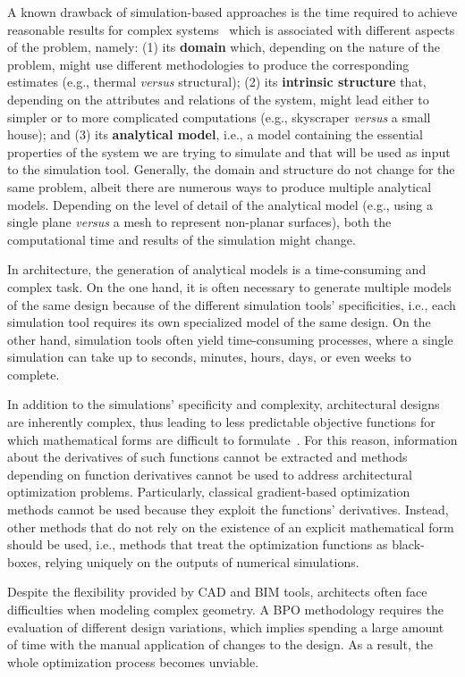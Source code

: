 	A known drawback of simulation-based approaches is the time required to achieve reasonable results for complex systems~\cite{Law1991} which is associated with different aspects of the problem, namely: (1) its \textbf{domain} which, depending on the nature of the problem, might use different methodologies to produce the corresponding estimates (e.g., thermal \textit{versus} structural); (2) its \textbf{intrinsic structure} that, depending on the attributes and relations of the system, might lead either to simpler or to more complicated computations (e.g., skyscraper \textit{versus} a small house); and (3) its \textbf{analytical model}, i.e., a model containing the essential properties of the system we are trying to simulate and that will be used as input to the simulation tool. Generally, the domain and structure do not change for the same problem, albeit there are numerous ways to produce multiple analytical models. Depending on the level of detail of the analytical model (e.g., using a single plane \textit{versus} a mesh to represent non-planar surfaces), both the computational time and results of the simulation might change. 

	In architecture, the generation of analytical models is a time-consuming and complex task. On the one hand, it is often necessary to generate multiple models of the same design because of the different simulation tools' specificities, i.e., each simulation tool requires its own specialized model of the same design. On the other hand, simulation tools often yield time-consuming processes, where a single simulation can take up to seconds, minutes, hours, days, or even weeks to complete. 
	
	In addition to the simulations' specificity and complexity, architectural designs are inherently complex, thus leading to less predictable objective functions for which mathematical forms are difficult to formulate~\cite{Machairas2014}. For this reason, information about the derivatives of such functions cannot be extracted and methods depending on function derivatives cannot be used to address architectural optimization problems. Particularly, classical gradient-based optimization methods cannot be used because they exploit the functions' derivatives. Instead, other methods that do not rely on the existence of an explicit mathematical form should be used, i.e., methods that treat the optimization functions as black-boxes, relying uniquely on the outputs of numerical simulations.
	
	Despite the flexibility provided by \ac{CAD} and \ac{BIM} tools, architects often face difficulties when modeling complex geometry. A \ac{BPO} methodology requires the evaluation of different design variations, which implies spending a large amount of time with the manual application of changes to the design. As a result, the whole optimization process becomes unviable.
	
